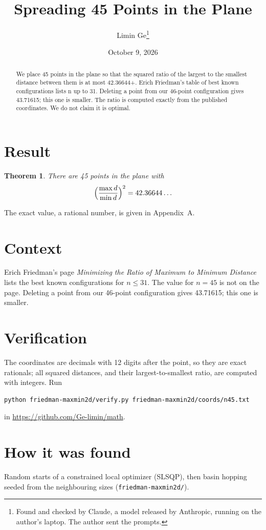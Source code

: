 \documentclass[11pt,a4paper]{article}
\title{Spreading 45 Points in the Plane}
\author{Limin Ge\thanks{Found and checked by Claude, a model released by Anthropic, running on the author's laptop. The author sent the prompts.}}
\date{October 9, 2026}
\newtheorem*{theorem}{Theorem}
\begin{document}
\maketitle
\begin{abstract}
We place 45 points in the plane so that the squared ratio of the largest to the smallest distance between them is at most 42.36644+. Erich Friedman's table of best known configurations lists n up to 31. Deleting a point from our 46-point configuration gives 43.71615; this one is smaller. The ratio is computed exactly from the published coordinates. We do not claim it is optimal.
\end{abstract}

\section{Result}
\begin{theorem}
There are 45 points in the plane with
\[ \Bigl(\frac{\max d}{\min d}\Bigr)^2 = 42.36644\ldots \]
\end{theorem}
The exact value, a rational number, is given in Appendix~A.


\section{Context}
Erich Friedman's page \emph{Minimizing the Ratio of Maximum to Minimum Distance} lists the best known configurations for $n\le 31$. The value for $n=45$ is not on the page. Deleting a point from our 46-point configuration gives 43.71615; this one is smaller.


\section{Verification}
The coordinates are decimals with 12 digits after the point, so they are exact rationals; all squared distances, and their largest-to-smallest ratio, are computed with integers. Run
\begin{verbatim}
python friedman-maxmin2d/verify.py friedman-maxmin2d/coords/n45.txt
\end{verbatim}
in \url{https://github.com/Ge-limin/math}.


\section{How it was found}
Random starts of a constrained local optimizer (SLSQP), then basin hopping seeded from the neighbouring sizes (\texttt{friedman-maxmin2d/}).
\end{document}
